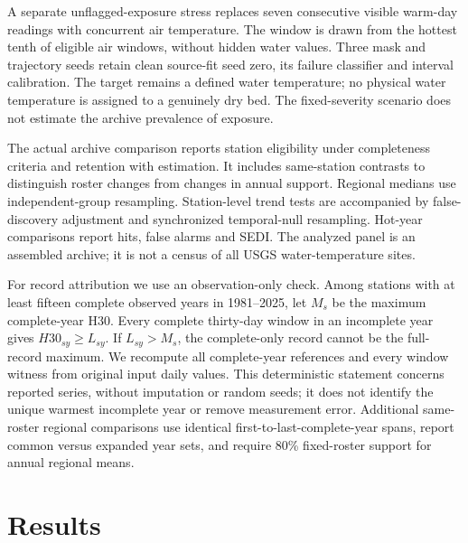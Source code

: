 \documentclass[draft,linenumbers]{agujournal2025}
\begin{document}
A separate unflagged-exposure stress replaces seven consecutive visible warm-day readings with concurrent air temperature. The window is drawn from the hottest tenth of eligible air windows, without hidden water values. Three mask and trajectory seeds retain clean source-fit seed zero, its failure classifier and interval calibration. The target remains a defined water temperature; no physical water temperature is assigned to a genuinely dry bed. The fixed-severity scenario does not estimate the archive prevalence of exposure.

The actual archive comparison reports station eligibility under completeness criteria and retention with estimation. It includes same-station contrasts to distinguish roster changes from changes in annual support. Regional medians use independent-group resampling. Station-level trend tests are accompanied by false-discovery adjustment and synchronized temporal-null resampling. Hot-year comparisons report hits, false alarms and SEDI. The analyzed panel is an assembled archive; it is not a census of all USGS water-temperature sites.

For record attribution we use an observation-only check. Among stations with at least fifteen complete observed years in 1981--2025, let $M_s$ be the maximum complete-year H30. Every complete thirty-day window in an incomplete year gives $H30_{sy}\geq L_{sy}$. If $L_{sy}>M_s$, the complete-only record cannot be the full-record maximum. We recompute all complete-year references and every window witness from original input daily values. This deterministic statement concerns reported series, without imputation or random seeds; it does not identify the unique warmest incomplete year or remove measurement error. Additional same-roster regional comparisons use identical first-to-last-complete-year spans, report common versus expanded year sets, and require 80\% fixed-roster support for annual regional means.



\section{Results}
\end{document}

